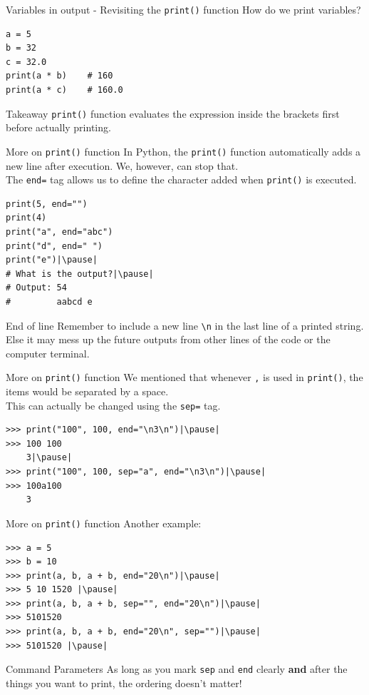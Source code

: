 \documentclass[dvipsnames, svgnames, x11names]{beamer}
\begin{document}
\begin{frame}[fragile]{Variables in output - Revisiting the \texttt{print()} function}
How do we print variables?

\begin{verbatim}
a = 5
b = 32
c = 32.0
print(a * b)    # 160
print(a * c)    # 160.0
\end{verbatim}
\pause
\begin{block}{Takeaway}
\texttt{print()} function evaluates the expression inside the brackets first before actually printing.
\end{block}
\end{frame}

\begin{frame}[fragile]{More on \texttt{print()} function}
In Python, the \texttt{print()} function automatically adds a new line after execution. We, however, can stop that.\\
The \texttt{end=} tag allows us to define the character added when \texttt{print()} is executed.
\begin{verbatim}
print(5, end="")
print(4)
print("a", end="abc")
print("d", end=" ")
print("e")|\pause|
# What is the output?|\pause|
# Output: 54
#         aabcd e
\end{verbatim}
\begin{block}{End of line}
Remember to include a new line {\color{BrickRed}\texttt{\textbackslash n}} in the last line of a printed string.\\
Else it may mess up the future outputs from other lines of the code or the computer terminal.
\end{block}
\end{frame}

\begin{frame}[fragile]{More on \texttt{print()} function}
We mentioned that whenever \texttt{,} is used in \texttt{print()}, the items would be separated by a space.\\
This can actually be changed using the \texttt{sep=} tag.\pause
\begin{verbatim}
>>> print("100", 100, end="\n3\n")|\pause|
>>> 100 100
	3|\pause|
>>> print("100", 100, sep="a", end="\n3\n")|\pause|
>>> 100a100
	3
\end{verbatim}

\end{frame}

\begin{frame}[fragile]{More on \texttt{print()} function}
Another example:
\begin{verbatim}
>>> a = 5
>>> b = 10
>>> print(a, b, a + b, end="20\n")|\pause|
>>> 5 10 1520 |\pause|
>>> print(a, b, a + b, sep="", end="20\n")|\pause|
>>> 5101520	
>>> print(a, b, a + b, end="20\n", sep="")|\pause|
>>> 5101520	|\pause|
\end{verbatim}
\begin{block}{Command Parameters}
As long as you mark \texttt{sep} and \texttt{end} clearly \textbf{and} after the things you want to print, the ordering doesn't matter!
\end{block}
\end{frame}
\end{document}
